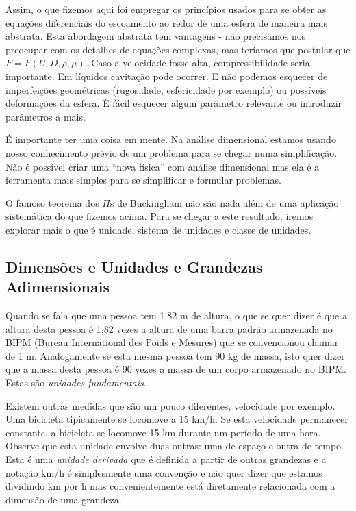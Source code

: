 Assim, o que fizemos aqui foi empregar os princípios usados para se obter as equações diferenciais do escoamento ao redor de uma esfera de maneira mais abstrata. Esta abordagem abstrata tem vantagens - não precisamos nos preocupar com os detalhes de equações complexas,  mas teríamos que postular que $F = F(U, D, \rho, \mu)$. Caso a velocidade fosse alta, compressibilidade seria importante. Em líquidos cavitação pode ocorrer. E não podemos esquecer de imperfeições geométricas (rugosidade, esfericidade por exemplo) ou possíveis deformações da esfera. É fácil esquecer algum parâmetro relevante ou introduzir parâmetros a mais. 

É importante ter uma coisa em mente. Na análise dimensional estamos usando nosso conhecimento prévio de um problema para se chegar numa simplificação. Não é possível criar uma ``nova física'' com análise dimensional mas ela é a ferramenta mais simples para se simplificar e formular problemas.

O famoso teorema dos $\Pi$s de Buckingham não são nada além de uma aplicação sistemática do que fizemos acima. Para se chegar a este resultado, iremos explorar mais o que é unidade, sistema de unidades e classe de unidades.



\subsection{Dimensões e Unidades e Grandezas Adimensionais}

Quando se fala que uma pessoa tem 1,82 m de altura, o que se quer dizer é que a altura desta pessoa é 1,82 vezes a altura de uma barra padrão armazenada no BIPM (Bureau International des Poids e Mesures) que se convencionou chamar de 1 m. Analogamente se esta mesma pessoa tem 90 kg de massa, isto quer dizer que a massa desta pessoa é 90 vezes a massa de um corpo armazenado no BIPM. Estas são \emph{unidades fundamentais}. 

Existem outras medidas que são um pouco diferentes, velocidade por exemplo. Uma bicicleta tipicamente se locomove a 15 km/h. Se esta velocidade permanecer constante, a bicicleta se locomove 15 km durante um período de uma hora. Observe que esta unidade envolve duas outras: uma de espaço e outra de tempo. Esta é uma \emph{unidade derivada} que é definida a partir de outras grandezas e a notação km/h é simplesmente uma convenção e não quer dizer que estamos dividindo km por h mas convenientemente está diretamente relacionada com a dimensão de uma grandeza.

